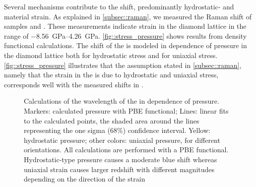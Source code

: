 	Several mechanisms contribute to the \cwl shift, predominantly hydrostatic- and material strain.
	As explained in \autoref{subsec::raman}, we measured the Raman shift of samples \insituS and \implantedTao.
	These measurements indicate strain in the diamond lattice in the range of \SIrange{-8.56}{4.26}{\giga\pascal}.
	\autoref{fig::stress_pressure} shows results from density functional calculations.
	The shift of the  \ZPL is modeled in dependence of pressure in the diamond lattice both for hydrostatic stress and for uniaxial stress.
	\autoref{fig::stress_pressure} illustrates that the assumption stated in \autoref{subsec::raman}, namely that the strain in the \nds is due to hydrostatic and uniaxial stress, corresponds well with the measured \ZPL shifts in \vl.

		\begin{figure}[htp]
			\centering
			\caption[Calculated dependence between \siv \ZPL and lattice pressure]{Calculations of the wavelength of the \siv \ZPL in dependence of pressure. Markers: calculated pressure with PBE functional; Lines: linear fits to the calculated points, the shaded area around the lines representing the one sigma (68\%) confidence interval. Yellow: hydrostatic pressure; other colors: uniaxial pressure, for different orientations. All calculations are performed with a PBE functional. Hydrostatic-type pressure causes a moderate blue shift whereas uniaxial strain causes larger redshift with different magnitudes depending on the direction of the strain}
			\label{fig::stress_pressure}
		\end{figure}

